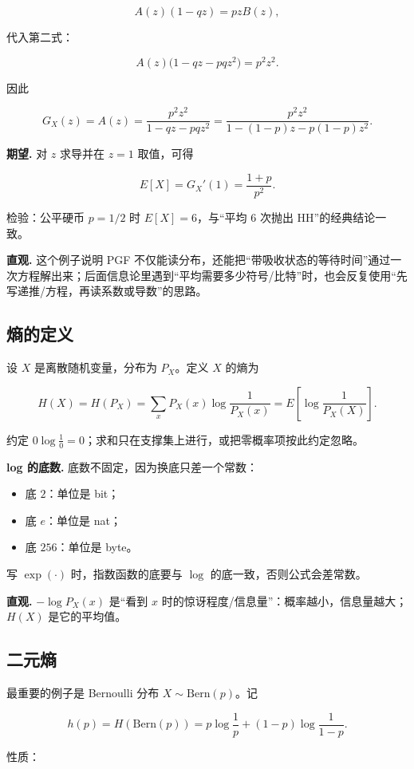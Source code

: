 \[
A(z)(1-qz)=pzB(z),
\]

代入第二式：

\[
A(z)\bigl(1-qz-pqz^2\bigr)=p^2z^2.
\]

因此

\[
\boxed{
G_X(z)=A(z)
=\frac{p^2z^2}{1-qz-pqz^2}
=\frac{p^2z^2}{1-(1-p)z-p(1-p)z^2}
}.
\]

\textbf{期望.} 对 $z$ 求导并在 $z=1$ 取值，可得

\[
E[X]=G_X'(1)=\frac{1+p}{p^2}.
\]

检验：公平硬币 $p=1/2$ 时 $E[X]=6$，与“平均 6 次抛出 HH”的经典结论一致。

\textbf{直观.} 这个例子说明 PGF 不仅能读分布，还能把“带吸收状态的等待时间”通过一次方程解出来；后面信息论里遇到“平均需要多少符号/比特”时，也会反复使用“先写递推/方程，再读系数或导数”的思路。

\subsection{熵的定义}


设 $X$ 是离散随机变量，分布为 $P_X$。定义 $X$ 的熵为

\[
H(X)=H(P_X)
=\sum_{x}P_X(x)\log\frac{1}{P_X(x)}
=E\left[\log\frac{1}{P_X(X)}\right].
\]

约定 $0\log\frac10=0$；求和只在支撑集上进行，或把零概率项按此约定忽略。

\textbf{log 的底数.} 底数不固定，因为换底只差一个常数：

\begin{itemize}
\item 底 $2$：单位是 bit；
\item 底 $e$：单位是 nat；
\item 底 $256$：单位是 byte。
\end{itemize}


写 $\exp(\cdot)$ 时，指数函数的底要与 $\log$ 的底一致，否则公式会差常数。

\textbf{直观.} $-\log P_X(x)$ 是“看到 $x$ 时的惊讶程度/信息量”：概率越小，信息量越大；$H(X)$ 是它的平均值。

\subsection{二元熵}


最重要的例子是 Bernoulli 分布 $X\sim\mathrm{Bern}(p)$。记

\[
h(p)=H(\mathrm{Bern}(p))
=p\log\frac1p+(1-p)\log\frac1{1-p}.
\]

性质：


